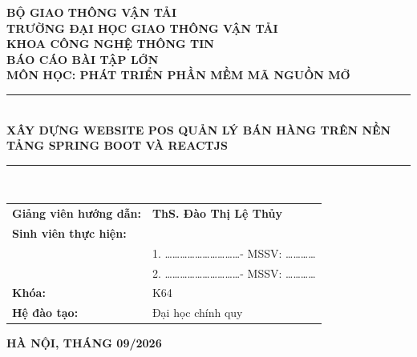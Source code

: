 \cleardoublepage
\begin{titlepage}
\begin{center}
    \vspace*{-10mm}
    {\fontsize{13pt}{15pt}\selectfont \textbf{BỘ GIAO THÔNG VẬN TẢI}}\\[3mm]
    {\fontsize{14pt}{16pt}\selectfont \textbf{TRƯỜNG ĐẠI HỌC GIAO THÔNG VẬN TẢI}}\\[2mm]
    {\fontsize{13pt}{15pt}\selectfont \textbf{KHOA CÔNG NGHỆ THÔNG TIN}}\\[15mm]

    {\fontsize{18pt}{22pt}\selectfont \textbf{BÁO CÁO BÀI TẬP LỚN}}\\[4mm]
    {\fontsize{14pt}{17pt}\selectfont \textbf{MÔN HỌC: PHÁT TRIỂN PHẦN MỀM MÃ NGUỒN MỞ}}\\[10mm]

    \noindent\rule{\textwidth}{1pt}\\[4mm]
    {\fontsize{18pt}{22pt}\selectfont \textbf{XÂY DỰNG WEBSITE POS QUẢN LÝ BÁN HÀNG TRÊN NỀN TẢNG SPRING BOOT VÀ REACTJS}}\\[4mm]
    \noindent\rule{\textwidth}{1pt}\\[25mm]

    \begin{minipage}{0.9\textwidth}
        \fontsize{13pt}{16pt}\selectfont
        \begin{tabular}{p{5.5cm}l}
            \textbf{Giảng viên hướng dẫn:} & \textbf{ThS. Đào Thị Lệ Thủy} \\[4mm]
            \textbf{Sinh viên thực hiện:}   & \\[2mm]
            & 1. \dots\dots\dots\dots\dots\dots\dots\dots\dots\dots - MSSV: \dots\dots\dots\dots \\[2mm]
            & 2. \dots\dots\dots\dots\dots\dots\dots\dots\dots\dots - MSSV: \dots\dots\dots\dots \\[3mm]
            \textbf{Khóa:}                  & K64 \\[2mm]
            \textbf{Hệ đào tạo:}           & Đại học chính quy \\
        \end{tabular}
    \end{minipage}

    \vfill
    {\fontsize{13pt}{15pt}\selectfont \textbf{HÀ NỘI, THÁNG 09/2026}}
\end{center}
\end{titlepage}


